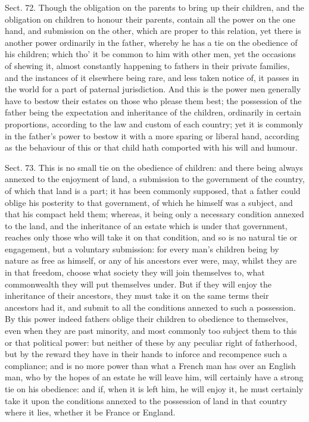 \documentclass[11pt,openany]{book}
\begin{document}
Sect. 72. Though the obligation on the parents to bring up their children, and the obligation on children to honour their parents, contain all the power on the one hand, and submission on the other, which are proper to this relation, yet there is another power ordinarily in the father, whereby he has a tie on the obedience of his children; which tho' it be common to him with other men, yet the occasions of shewing it, almost constantly happening to fathers in their private families, and the instances of it elsewhere being rare, and less taken notice of, it passes in the world for a part of paternal jurisdiction. And this is the power men generally have to bestow their estates on those who please them best; the possession of the father being the expectation and inheritance of the children, ordinarily in certain proportions, according to the law and custom of each country; yet it is commonly in the father's power to bestow it with a more sparing or liberal hand, according as the behaviour of this or that child hath comported with his will and humour.

Sect. 73. This is no small tie on the obedience of children: and there being always annexed to the enjoyment of land, a submission to the government of the country, of which that land is a part; it has been commonly supposed, that a father could oblige his posterity to that government, of which he himself was a subject, and that his compact held them; whereas, it being only a necessary condition annexed to the land, and the inheritance of an estate which is under that government, reaches only those who will take it on that condition, and so is no natural tie or engagement, but a voluntary submission: for every man's children being by nature as free as himself, or any of his ancestors ever were, may, whilst they are in that freedom, choose what society they will join themselves to, what commonwealth they will put themselves under. But if they will enjoy the inheritance of their ancestors, they must take it on the same terms their ancestors had it, and submit to all the conditions annexed to such a possession. By this power indeed fathers oblige their children to obedience to themselves, even when they are past minority, and most commonly too subject them to this or that political power: but neither of these by any peculiar right of fatherhood, but by the reward they have in their hands to inforce and recompence such a compliance; and is no more power than what a French man has over an English man, who by the hopes of an estate he will leave him, will certainly have a strong tie on his obedience: and if, when it is left him, he will enjoy it, he must certainly take it upon the conditions annexed to the possession of land in that country where it lies, whether it be France or England.
\end{document}
